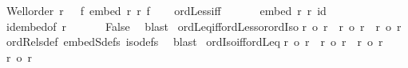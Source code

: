 \begin{isabellebody}
\ {\isachardoublequoteopen}Well{\isacharunderscore}{\kern0pt}order\ r\ {\isasymand}\ \ {\isasymnot}{\isacharparenleft}{\kern0pt}{\isasymexists}f{\isachardot}{\kern0pt}\ embed\ r\ r\ f{\isacharparenright}{\kern0pt}{\isachardoublequoteclose}\isanewline
\ \ \isamarkupfalse%
\ ordLess{\isacharunderscore}{\kern0pt}iff\ \isacommand{{\isachardot}{\kern0pt}{\isachardot}{\kern0pt}}\isamarkupfalse%
\isanewline
\ \ \isamarkupfalse%
\ \isamarkupfalse%
\ {\isachardoublequoteopen}embed\ r\ r\ id{\isachardoublequoteclose}\ \isamarkupfalse%
\ id{\isacharunderscore}{\kern0pt}embed{\isacharbrackleft}{\kern0pt}of\ r{\isacharbrackright}{\kern0pt}\ \isacommand{{\isachardot}{\kern0pt}}\isamarkupfalse%
\isanewline
\ \ \isamarkupfalse%
\ \isamarkupfalse%
\ False\ \isamarkupfalse%
\ blast\isanewline
{}\isamarkupfalse%
%
\endisatagproof
{\isafoldproof}%
%
\isadelimproof
\isanewline
%
\endisadelimproof
\isanewline
{}\isamarkupfalse%
\ ordLeq{\isacharunderscore}{\kern0pt}iff{\isacharunderscore}{\kern0pt}ordLess{\isacharunderscore}{\kern0pt}or{\isacharunderscore}{\kern0pt}ordIso{\isacharcolon}{\kern0pt}\isanewline
{\isachardoublequoteopen}r\ {\isasymle}o\ r{\isacharprime}{\kern0pt}\ {\isacharequal}{\kern0pt}\ {\isacharparenleft}{\kern0pt}r\ {\isacharless}{\kern0pt}o\ r{\isacharprime}{\kern0pt}\ {\isasymor}\ r\ {\isacharequal}{\kern0pt}o\ r{\isacharprime}{\kern0pt}{\isacharparenright}{\kern0pt}{\isachardoublequoteclose}\isanewline
%
\isadelimproof
%
\endisadelimproof
%
\isatagproof
{}\isamarkupfalse%
\ ordRels{\isacharunderscore}{\kern0pt}def\ embedS{\isacharunderscore}{\kern0pt}defs\ iso{\isacharunderscore}{\kern0pt}defs\ \isamarkupfalse%
\ blast%
\endisatagproof
{\isafoldproof}%
%
\isadelimproof
\isanewline
%
\endisadelimproof
\isanewline
{}\isamarkupfalse%
\ ordIso{\isacharunderscore}{\kern0pt}iff{\isacharunderscore}{\kern0pt}ordLeq{\isacharcolon}{\kern0pt}\isanewline
{\isachardoublequoteopen}{\isacharparenleft}{\kern0pt}r\ {\isacharequal}{\kern0pt}o\ r{\isacharprime}{\kern0pt}{\isacharparenright}{\kern0pt}\ {\isacharequal}{\kern0pt}\ {\isacharparenleft}{\kern0pt}r\ {\isasymle}o\ r{\isacharprime}{\kern0pt}\ {\isasymand}\ r{\isacharprime}{\kern0pt}\ {\isasymle}o\ r{\isacharparenright}{\kern0pt}{\isachardoublequoteclose}\isanewline
%
\isadelimproof
%
\endisadelimproof
%
\isatagproof
{}\isamarkupfalse%
\isanewline
\ \ \isamarkupfalse%
\ {\isachardoublequoteopen}r\ {\isacharequal}{\kern0pt}o\ r{\isacharprime}{\kern0pt}{\isachardoublequoteclose}\isanewline

\end{isabellebody}
